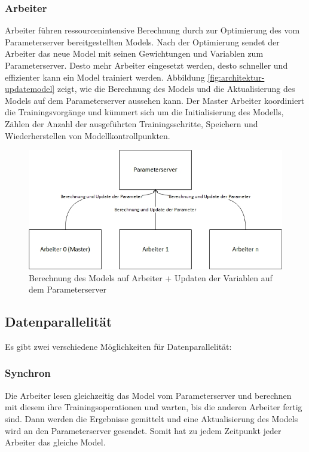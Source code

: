 \subsubsection{Arbeiter}
Arbeiter führen ressourcenintensive Berechnung durch zur Optimierung des vom Parameterserver bereitgestellten Models. Nach der Optimierung sendet der Arbeiter das neue Model mit seinen Gewichtungen und Variablen zum Parameterserver. Desto mehr Arbeiter eingesetzt werden, desto schneller und effizienter kann ein Model trainiert werden. Abbildung \ref{fig:architektur-updatemodel} zeigt, wie die Berechnung des Models und die Aktualisierung des Models auf dem Parameterserver aussehen kann. Der Master Arbeiter koordiniert die Trainingsvorgänge und kümmert sich um die Initialisierung des Modells, Zählen der Anzahl der ausgeführten Trainingsschritte, Speichern und Wiederherstellen von Modellkontrollpunkten.

\begin{figure}[h!]
	\centering
	\includegraphics[width=0.9\linewidth]{Pictures/Architektur-UpdateModel}
	\caption[Berechnung des Models auf Arbeiter + Updaten der Variablen auf dem Parameterserver]{Berechnung des Models auf Arbeiter + Updaten der Variablen auf dem Parameterserver}
	\label{fig:architektur-servemodel}
\end{figure}

\subsection{Datenparallelität}
Es gibt zwei verschiedene Möglichkeiten für Datenparallelität:
\subsubsection{Synchron}
Die Arbeiter lesen gleichzeitig das Model vom Parameterserver und berechnen mit diesem ihre Trainingsoperationen und warten, bis die anderen Arbeiter fertig sind. Dann werden die Ergebnisse gemittelt und eine Aktualisierung des Models wird an den Parameterserver gesendet. Somit hat zu jedem Zeitpunkt jeder Arbeiter das gleiche Model.

